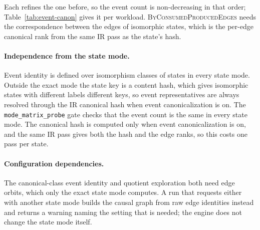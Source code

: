 Each refines the one before, so the event count is non-decreasing in that order;
Table~\ref{tab:event-canon} gives it per workload. \textsc{ByConsumedProducedEdges} needs the
correspondence between the edges of isomorphic states, which is the per-edge canonical rank from
the same IR pass as the state's hash.

\paragraph{Independence from the state mode.} Event identity is defined over isomorphism classes of
states in every state mode. Outside the exact mode the state key is a content hash, which gives
isomorphic states with different labels different keys, so event representatives are always
resolved through the IR canonical hash when event canonicalization is on. The
\texttt{mode\_matrix\_probe} gate checks that the event count is the same in every state mode. The
canonical hash is computed only when event canonicalization is on, and the same IR pass gives both
the hash and the edge ranks, so this costs one pass per state.

\paragraph{Configuration dependencies.}
The canonical-class event identity and quotient exploration both need edge orbits, which only the
exact state mode computes. A run that requests either with another state mode builds the causal
graph from raw edge identities instead and returns a warning naming the setting that is needed;
the engine does not change the state mode itself.

